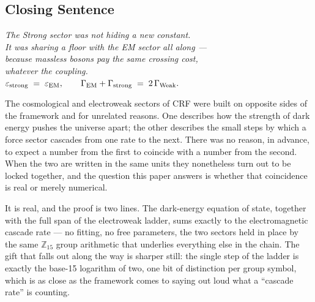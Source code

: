 \documentclass[12pt, a4paper]{article}
\begin{document}
\subsection{Closing Sentence}

\bigskip
\begin{center}
\textit{%
  The Strong sector was not hiding a new constant.\\[0.3em]
  It was sharing a floor with the EM sector all along ---\\
  because massless bosons pay the same crossing cost,\\
  whatever the coupling.\\[0.5em]
  $\displaystyle
    \varepsilon_{\rm strong} \;=\; \varepsilon_{\rm EM},
    \qquad
    \Gamma_{\rm EM} + \Gamma_{\rm strong} \;=\; 2\,\Gamma_{\rm Weak}.$
}
\end{center}


\newpage

The cosmological and electroweak sectors of CRF were built on opposite sides
of the framework and for unrelated reasons. One describes how the strength of
dark energy pushes the universe apart; the other describes the small steps by
which a force sector cascades from one rate to the next. There was no reason,
in advance, to expect a number from the first to coincide with a number from
the second. When the two are written in the same units they nonetheless turn
out to be locked together, and the question this paper answers is whether that
coincidence is real or merely numerical.

It is real, and the proof is two lines. The dark-energy equation of state,
together with the full span of the electroweak ladder, sums exactly to the
electromagnetic cascade rate --- no fitting, no free parameters, the two
sectors held in place by the same $\mathbb{Z}_{15}$ group arithmetic that
underlies everything else in the chain. The gift that falls out along the way
is sharper still: the single step of the ladder is exactly the base-15
logarithm of two, one bit of distinction per group symbol, which is as close
as the framework comes to saying out loud what a ``cascade rate'' is counting.
\end{document}
